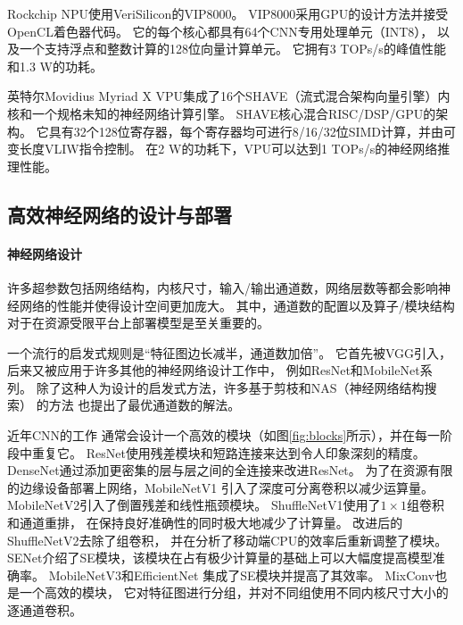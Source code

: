 Rockchip NPU\cite{rk3399pro}使用VeriSilicon的VIP8000。
VIP8000采用GPU的设计方法并接受OpenCL着色器代码。
它的每个核心都具有64个CNN专用处理单元（INT8），
以及一个支持浮点和整数计算的128位向量计算单元。
它拥有3 TOPs/s的峰值性能和1.3 W的功耗。

英特尔Movidius Myriad X VPU集成了16个SHAVE（流式混合架构向量引擎）内核和一个规格未知的神经网络计算引擎。
SHAVE核心\cite{shave}混合RISC/DSP/GPU的架构。
它具有32个128位寄存器，每个寄存器均可进行8/16/32位SIMD计算，并由可变长度VLIW指令控制。
在2 W的功耗下，VPU可以达到1 TOPs/s的神经网络推理性能。

\subsection{高效神经网络的设计与部署}
\label{nn design and deployment}

\paragraph{神经网络设计}
许多超参数包括网络结构，内核尺寸，输入/输出通道数，网络层数等都会影响神经网络的性能并使得设计空间更加庞大。
其中，通道数的配置以及算子/模块结构对于在资源受限平台上部署模型是至关重要的。

一个流行的启发式规则是``特征图边长减半，通道数加倍''。
它首先被VGG\cite{simonyan2014very}引入，
后来又被应用于许多其他的神经网络设计工作中，
例如ResNet\cite{he2016deep}和MobileNet\cite{howard2017mobilenets, sandler2018mobilenetv2}系列。
除了这种人为设计的启发式方法，许多基于剪枝和NAS（神经网络结构搜索）
\cite{he2018amc, lee2019device, liu2019metapruning}的方法
也提出了最优通道数的解法。

近年CNN的工作\cite{he2016deep, ma2018shufflenet, sandler2018mobilenetv2}
通常会设计一个高效的模块（如图\ref{fig:blocks}所示），并在每一阶段中重复它。
ResNet\cite{he2016deep}使用残差模块和短路连接来达到令人印象深刻的精度。
DenseNet\cite{huang2017densely}通过添加更密集的层与层之间的全连接来改进ResNet。
为了在资源有限的边缘设备部署上网络，MobileNetV1\cite{howard2017mobilenets}
引入了深度可分离卷积以减少运算量。
MobileNetV2\cite{sandler2018mobilenetv2}引入了倒置残差和线性瓶颈模块。
ShuffleNetV1\cite{zhang2018shufflenet}使用了$1\times 1$组卷积和通道重排，
在保持良好准确性的同时极大地减少了计算量。
改进后的ShuffleNetV2\cite{ma2018shufflenet}去除了组卷积，
并在分析了移动端CPU的效率后重新调整了模块。
SENet\cite{hu2018squeeze}介绍了SE模块，该模块在占有极少计算量的基础上可以大幅度提高模型准确率。
MobileNetV3\cite{howard2019searching}和EfficientNet\cite{tan2019efficientnet}
集成了SE模块并提高了其效率。
MixConv\cite{tan2019mixconv}也是一个高效的模块，
它对特征图进行分组，并对不同组使用不同内核尺寸大小的逐通道卷积。

